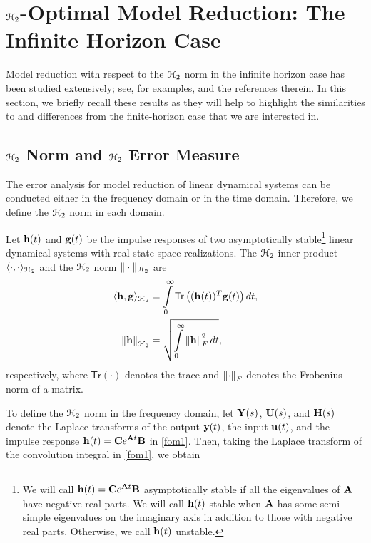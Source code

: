 \documentclass[twocolumn]{autart}
\begin{document}
\section{$\EuScript{H}_2$-Optimal Model Reduction: The Infinite Horizon Case} \label{sec:intro}
Model reduction with respect to the $\EuScript{H}_2$ norm in the infinite horizon case has been studied extensively; see, for examples, \cite{BarCO91,BryC90,FulO90,MeiL67,Hal92,HylB85,SpaMM92,YanL99,LepMPV91,GugBA08,AniBGA13,Wil70,vuillemin2014poles,CasL18,panzer2013,gerstner2007hom,VanGA08,breiten2013near} and the references therein. 
In this section, we briefly recall these results as they will help to highlight the similarities to and differences from the finite-horizon case that we are interested in.


\subsection{$\EuScript{H}_2$ Norm and $\EuScript{H}_2$ Error Measure}
The error analysis for model reduction of linear dynamical systems can be conducted either in the frequency domain or in the time domain. Therefore, we define the $\EuScript{H}_2$ norm in each domain. 
\begin{Definition}
Let $\mathbf{h}(t)$ and $\mathbf{g}(t)$ be the impulse responses of two asymptotically stable\footnote{We will call
$\mathbf{h}(t) = \mathbf{C} e^{\mathbf{A} t} \mathbf{B}$ asymptotically stable if all the eigenvalues of $\mathbf{A}$ have negative real parts. We will call 
$\mathbf{h}(t)$ stable when $\mathbf{A}$ has some semi-simple eigenvalues on the imaginary axis in addition to those with negative real parts. Otherwise, we call  $\mathbf{h}(t)$ unstable.}
linear dynamical systems with real state-space realizations.
The $\EuScript{H}_2$ inner product $\langle \cdot, \cdot \rangle_{\EuScript{H}_2}$ and the $\EuScript{H}_2$ norm $\| \cdot \|_{\EuScript{H}_2}$  are 
\begin{align*}
\langle \h, \g \rangle_{\ch_2} &=\int_0^\infty \mathsf{Tr}\left((\h(t))^T \g(t)\right) dt,\\
\norm{\h}_{\ch_2}&= \sqrt{ \int_0^\infty \norm{\h}_F^2 dt },
\end{align*} 
respectively, where $ \mathsf{Tr}(\cdot)$ denotes the trace and $\left\lVert\cdot\right\rVert_F$ denotes the Frobenius norm of a matrix.
\end{Definition}
To define the $\EuScript{H}_2$ norm in the frequency domain, let $\mathbf{Y}(s)$, $\mathbf{U}(s)$, and $\mathbf{H}(s)$ denote the Laplace transforms of 
 the output $\mathbf{y}(t)$, the input $\mathbf{u}(t)$, and the impulse response $\mathbf{h}(t) = \mathbf{C} e^{\mathbf{A} t}\mathbf{B}$
in \eqref{fom1}. Then, taking the Laplace transform of the convolution integral in  \eqref{fom1}, we obtain
\end{document}

